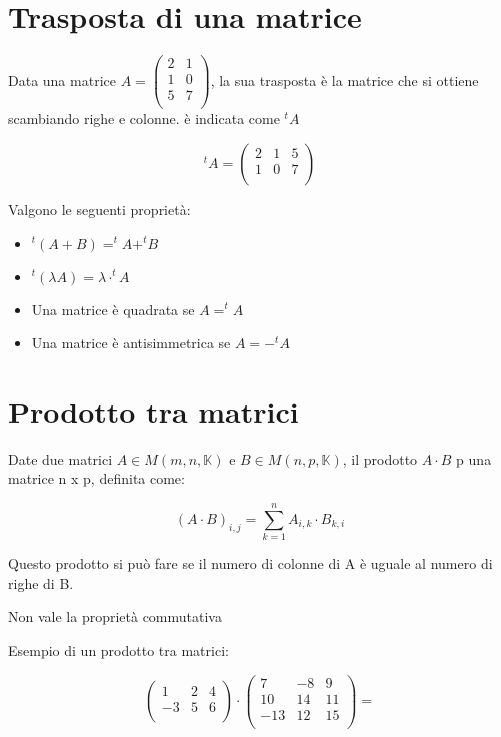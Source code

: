 \documentclass[a4paper, 10pt]{article}
\begin{document}
\section{Trasposta di una matrice}

Data una matrice $ A=\left(\begin{matrix}2&1\\1&0\\5&7\\\end{matrix}\right) $, la sua trasposta è la matrice che si ottiene scambiando righe e colonne. è indicata come $^tA$

$$ ^tA=\left(\begin{matrix}2&1&5\\1&0&7\\\end{matrix}\right) $$

Valgono le seguenti proprietà:
\begin{itemize}
	\item $^t(A+B)=^tA+^tB$
	\item $ ^t(\lambda A)=\lambda \cdot ^{t}A$
	\item Una matrice è quadrata se $ A = ^tA$
	\item Una matrice è antisimmetrica se $ A = -^tA$
\end{itemize}

\section{Prodotto tra matrici}

Date due matrici $A\in M\left(m,n,\mathbb{K}\right)$ e $ B\in M\left(n,p,\mathbb{K}\right) $, il prodotto $ A \cdot B $ p una matrice n x p, definita come:

$$ \left(A\cdot B\right)_{i,j}=\sum_{k=1}^{n}{A_{i,k}}\cdot B_{k,i} $$

Questo prodotto si può fare se il numero di colonne di A è uguale al numero di righe di B.

Non vale la proprietà commutativa

Esempio di un prodotto tra matrici:

$$\left(\begin{matrix}1&2&4\\-3&5&6\\\end{matrix}\right)\cdot\left(\begin{matrix}7&-8&9\\10&14&11\\-13&12&15\\\end{matrix}\right)=$$
\end{document}
